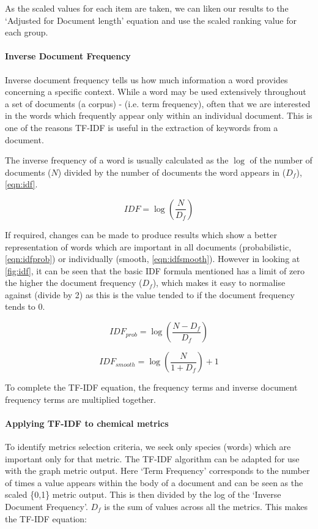 As the scaled values for each item are taken, we can liken our results to the `Adjusted for Document length' equation and use the scaled ranking value for each group.

\paragraph*{Inverse Document Frequency}
Inverse document frequency tells us how much information a word provides concerning a specific context. While a word may be used extensively throughout a set of documents (a corpus) -  (i.e. term frequency), often that we are interested in the words which frequently appear only within an individual document. This is one of the reasons TF-IDF is useful in the extraction of keywords from a document.

The inverse frequency of a word is usually calculated as the $\log$ of the number of documents ($N$) divided by the number of documents the word appears in ($D_f$), \autoref{eqn:idf}.


\begin{equation}
    IDF = \log(\frac{N}{D_f})
    \label{eqn:idf}
\end{equation}

If required, changes can be made to produce results which show a better representation of words which are important in all documents (probabilistic, \autoref{eqn:idfprob}) or individually (smooth, \autoref{eqn:idfsmooth}). However in looking at \autoref{fig:idf}, it can be seen that the basic IDF formula mentioned has a limit of zero the higher the document frequency ($D_f$), which makes it easy to normalise against (divide by 2) as this is the value tended to if the document frequency tends to 0.


\begin{equation}
    IDF_{prob} = \log(\frac{N-D_f}{D_f})
    \label{eqn:idfprob}
\end{equation}

\begin{equation}
    IDF_{smooth} = \log(\frac{N}{1+D_f})+1
    \label{eqn:idfsmooth}
\end{equation}


To complete the TF-IDF equation, the frequency terms and inverse document frequency terms are multiplied together.

\paragraph*{Applying TF-IDF to chemical metrics}
To identify metrics selection criteria, we seek only species (words) which are important only for that metric. The TF-IDF algorithm can be adapted for use with the graph metric output. Here `Term Frequency' corresponds to the number of times a value appears within the body of a document and can be seen as the scaled \{0,1\} metric output. This is then divided by the log of the `Inverse Document Frequency'.  $D_f$ is the sum of values across all the metrics. This makes the TF-IDF equation:

